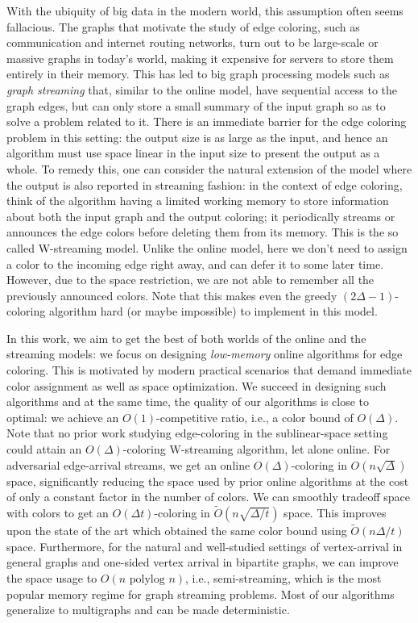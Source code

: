 \documentclass[10pt]{article}
\theoremstyle{definition}\newtheorem{definition}[lemma]{Definition}
\theoremstyle{remark}  \newtheorem*{remark}{Remark}
\newcommand{\tO}{\widetilde{O}}
\begin{document}
With the ubiquity of big data in the modern world, this assumption often seems fallacious. The graphs that motivate the study of edge coloring, such as communication and internet routing networks, turn out to be large-scale or massive graphs in today's world, making it expensive for servers to store them entirely in their memory. This has led to big graph processing models such as \emph{graph streaming} that, similar to the online model, have sequential access to the graph edges, but can only store a small summary of the input graph so as to solve a problem related to it. There is an immediate barrier for the edge coloring problem in this setting: the output size is as large as the input, and hence an algorithm must use space linear in the input size to present the output as a whole. To remedy this, one can consider the natural extension of the model where the output is also reported in streaming fashion: in the context of edge coloring, think of the algorithm having a limited working memory to store information about both the input graph and the output coloring; it periodically streams or announces the edge colors before deleting them from its memory. This is the so called W-streaming model. Unlike the online model, here we don't need to assign a color to the incoming edge right away, and can defer it to some later time. However, due to the space restriction, we are not able to remember all the previously announced colors. Note that this makes even the greedy $(2\Delta-1)$-coloring algorithm hard (or maybe impossible) to implement in this model.

 In this work, we aim to get the best of both worlds of the online and the streaming models: we focus on designing \emph{low-memory} online algorithms for edge coloring. This is motivated by modern practical scenarios that demand immediate color assignment as well as space optimization. We succeed in designing such algorithms and at the same time, the quality of our algorithms is close to optimal: we achieve an $O(1)$-competitive ratio, i.e., a color bound of $O(\Delta)$. Note that no prior work studying edge-coloring in the sublinear-space setting could attain an $O(\Delta)$-coloring W-streaming algorithm, let alone online. For adversarial edge-arrival streams, we get an online $O(\Delta)$-coloring in $O(n\sqrt{\Delta})$ space, significantly reducing the space used by prior online algorithms at the cost of only a constant factor in the number of colors. We can smoothly tradeoff space with colors to get an $O(\Delta t)$-coloring in $\tO(n\sqrt{\Delta/t})$ space. This improves upon the state of the art \cite{CharikarL21,AnsariSZ22} which obtained the same color bound using $\tO(n\Delta/t)$ space. Furthermore, for the natural and well-studied settings of vertex-arrival in general graphs and one-sided vertex arrival in bipartite graphs, we can improve the space usage to $O(n \text{ polylog }n)$, i.e., semi-streaming, which is the most popular memory regime for graph streaming problems. Most of our algorithms generalize to multigraphs and can be made deterministic.
 
\end{document}
